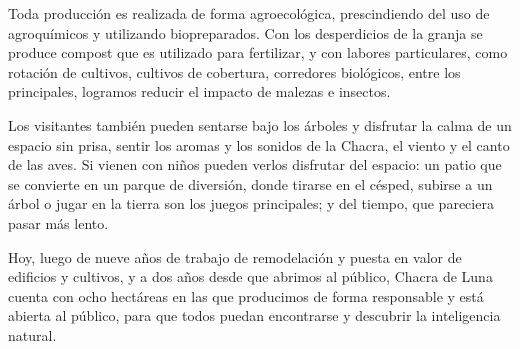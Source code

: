 Toda producción es realizada de forma agroecológica, prescindiendo del
uso de agroquímicos y utilizando biopreparados. Con los desperdicios de
la granja se produce compost que es utilizado para fertilizar, y con
labores particulares, como rotación de cultivos, cultivos de cobertura,
corredores biológicos, entre los principales, logramos reducir el
impacto de malezas e insectos.

Los visitantes también pueden sentarse bajo los árboles y disfrutar la
calma de un espacio sin prisa, sentir los aromas y los sonidos de la
Chacra, el viento y el canto de las aves. Si vienen con niños pueden
verlos disfrutar del espacio: un patio que se convierte en un parque de
diversión, donde tirarse en el césped, subirse a un árbol o jugar en la
tierra son los juegos principales; y del tiempo, que pareciera pasar más
lento.

Hoy, luego de nueve años de trabajo de remodelación y puesta en valor de
edificios y cultivos, y a dos años desde que abrimos al público, Chacra
de Luna cuenta con ocho hectáreas en las que producimos de forma
responsable y está abierta al público, para que todos puedan encontrarse
y descubrir la inteligencia natural.